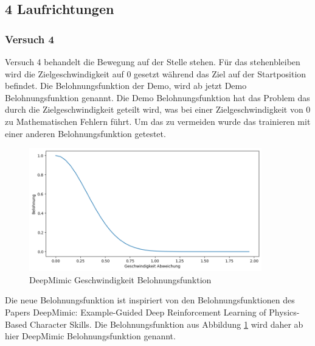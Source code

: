 \subsection{4 Laufrichtungen}
\subsubsection{Versuch 4}
\label{subsec:versuch4}
Versuch 4 behandelt die Bewegung auf der Stelle stehen. Für das stehenbleiben wird die Zielgeschwindigkeit auf 0 gesetzt während das Ziel auf der Startposition befindet. Die Belohnungsfunktion der Demo, wird ab jetzt Demo Belohnungsfunktion genannt. Die Demo Belohnungsfunktion hat das Problem das durch die Zielgeschwindigkeit geteilt wird, was bei einer Zielgeschwindigkeit von 0 zu Mathematischen Fehlern führt. Um das zu vermeiden wurde das trainieren mit einer anderen Belohnungsfunktion getestet.
\begin{figure}[H]
  \centering  
  \includegraphics[width=0.9\textwidth]{img/plot_deepmimic_vel}
  \caption{DeepMimic Geschwindigkeit Belohnungsfunktion}
  \label{fig:plot_deepmimic_vel}
\end{figure}
Die neue Belohnungsfunktion ist inspiriert von den Belohnungsfunktionen des Papers \grqq{}DeepMimic: Example-Guided Deep Reinforcement Learning of Physics-Based Character Skills\grqq{}.\cite{peng2018deepmimic}
Die Belohnungsfunktion aus Abbildung \ref{fig:plot_deepmimic_vel} wird daher ab hier DeepMimic Belohnungsfunktion genannt.

